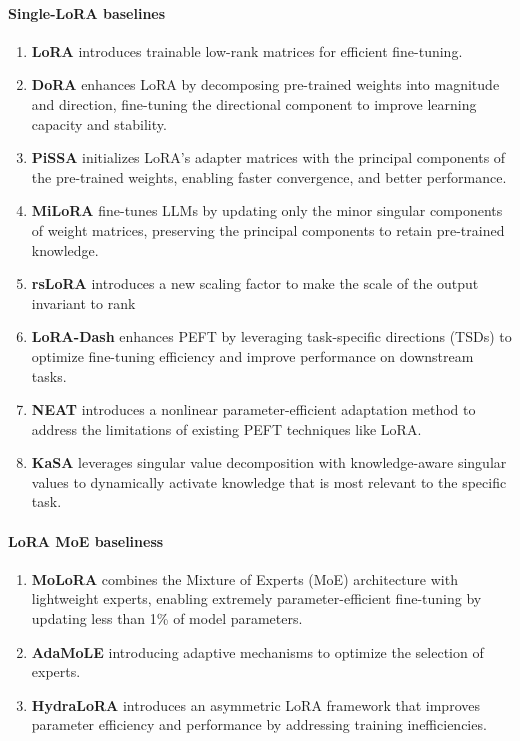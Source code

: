 \paragraph{Single-LoRA baselines}
\begin{enumerate}
\item \textbf{LoRA} \cite{hulora} introduces trainable low-rank matrices for efficient fine-tuning. 
\item \textbf{DoRA} \cite{liudora} enhances LoRA by decomposing pre-trained weights into magnitude and direction, fine-tuning the directional component to improve learning capacity and stability.
\item \textbf{PiSSA} \cite{meng2024pissa} initializes LoRA's adapter matrices with the principal components of the pre-trained weights, enabling faster convergence, and better performance.
\item \textbf{MiLoRA} \cite{wang2024miloraharnessingminorsingular} fine-tunes LLMs by updating only the minor singular components of weight matrices, preserving the principal components to retain pre-trained knowledge.
\item \textbf{rsLoRA} \cite{kalajdzievski2023rankstabilizationscalingfactor} introduces a new scaling factor to make the scale of the output invariant to rank
\item \textbf{LoRA-Dash} \cite{si2024unleashingpowertaskspecificdirections} enhances PEFT by leveraging task-specific directions (TSDs) to optimize fine-tuning efficiency and improve performance on downstream tasks.
\item \textbf{NEAT} \cite{zhong2024neatnonlinearparameterefficientadaptation} introduces a nonlinear parameter-efficient adaptation method to address the limitations of existing PEFT techniques like LoRA.
\item \textbf{KaSA} \cite{wang2024kasaknowledgeawaresingularvalueadaptation} leverages singular value decomposition with knowledge-aware singular values to dynamically activate knowledge that is most relevant to the specific task. 
\end{enumerate}

\paragraph{LoRA MoE baseliness}
\begin{enumerate}
\item \textbf{MoLoRA} \cite{zadouri2024pushing} combines the Mixture of Experts (MoE) architecture with lightweight experts, enabling extremely parameter-efficient fine-tuning by updating less than 1\% of model parameters.
\item  \textbf{AdaMoLE} \cite{liu2024adamole} introducing adaptive mechanisms to optimize the selection of experts. 
\item \textbf{HydraLoRA} \cite{tian2024hydraloraasymmetricloraarchitecture} introduces an asymmetric LoRA framework that improves parameter efficiency and performance by addressing training inefficiencies.
\end{enumerate}


